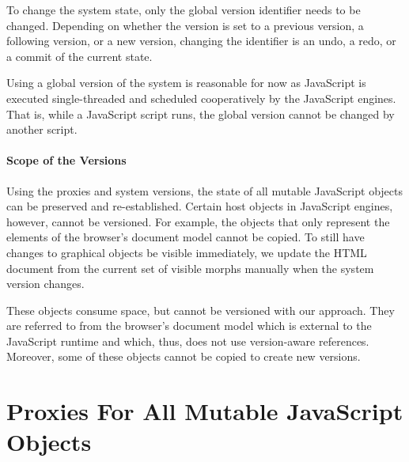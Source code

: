 To change the system state, only the global version identifier needs to be changed.
Depending on whether the version is set to a previous version, a following version, or a new version, changing the identifier is an undo, a redo, or a commit of the current state.

Using a global version of the system is reasonable for now as JavaScript is executed single-threaded and scheduled cooperatively by the JavaScript engines.
That is, while a JavaScript script runs, the global version cannot be changed by another script.

\paragraph{Scope of the Versions}
Using the proxies and system versions, the state of all mutable JavaScript objects can be preserved and re-established.
Certain host objects in JavaScript engines, however, cannot be versioned.
For example, the objects that only represent the elements of the browser's document model cannot be copied.
To still have changes to graphical objects be visible immediately, we update the HTML document from the current set of visible morphs manually when the system version changes.



These objects consume space, but cannot be versioned with our approach.
They are referred to from the browser's document model which is external to the JavaScript runtime and which, thus, does not use version-aware references.
Moreover, some of these objects cannot be copied to create new versions.



\section{Proxies For All Mutable JavaScript Objects}

